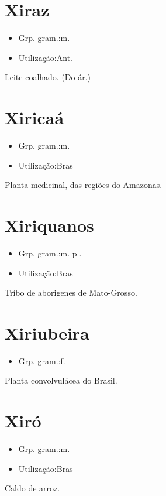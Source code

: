 \section{Xiraz}
\begin{itemize}
\item {Grp. gram.:m.}
\end{itemize}
\begin{itemize}
\item {Utilização:Ant.}
\end{itemize}
Leite coalhado.
(Do ár.)
\section{Xiricaá}
\begin{itemize}
\item {Grp. gram.:m.}
\end{itemize}
\begin{itemize}
\item {Utilização:Bras}
\end{itemize}
Planta medicinal, das regiões do Amazonas.
\section{Xiriquanos}
\begin{itemize}
\item {Grp. gram.:m. pl.}
\end{itemize}
\begin{itemize}
\item {Utilização:Bras}
\end{itemize}
Tríbo de aborigenes de Mato-Grosso.
\section{Xiriubeira}
\begin{itemize}
\item {Grp. gram.:f.}
\end{itemize}
Planta convolvulácea do Brasil.
\section{Xiró}
\begin{itemize}
\item {Grp. gram.:m.}
\end{itemize}
\begin{itemize}
\item {Utilização:Bras}
\end{itemize}
Caldo de arroz.
